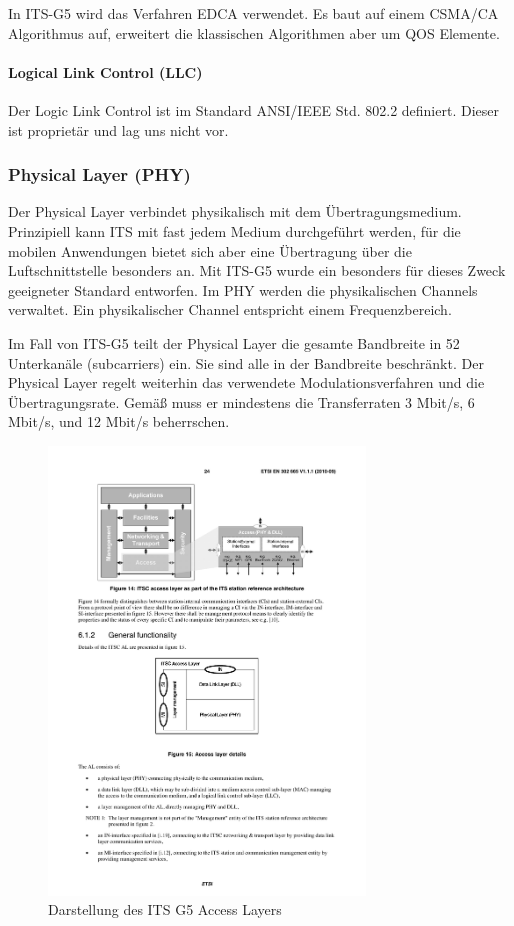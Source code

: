 In \ac{ITS-G5} wird das Verfahren \ac{EDCA} verwendet. Es baut auf einem CSMA/CA Algorithmus auf, erweitert die klassischen Algorithmen aber um \ac{QOS} Elemente. 

\paragraph{Logical Link Control (LLC)}
Der Logic Link Control ist im Standard ANSI/IEEE Std. 802.2 definiert. Dieser ist  proprietär und lag uns nicht vor.

\subsubsection{Physical Layer (PHY)}
Der Physical Layer verbindet physikalisch mit dem Übertragungsmedium. Prinzipiell kann \ac{ITS} mit fast jedem Medium durchgeführt werden, für die mobilen Anwendungen bietet sich aber eine Übertragung über die Luftschnittstelle besonders an. Mit  \ac{ITS-G5} wurde ein besonders für dieses Zweck geeigneter Standard entworfen. Im PHY werden die physikalischen Channels verwaltet. Ein physikalischer Channel entspricht einem Frequenzbereich. 

Im Fall von \ac{ITS-G5} teilt der Physical Layer die gesamte Bandbreite in 52 Unterkanäle (subcarriers) ein. Sie sind alle in der Bandbreite beschränkt. Der Physical Layer regelt weiterhin das verwendete Modulationsverfahren und die Übertragungsrate. Gemäß \cite{en302663} muss er mindestens die Transferraten 3 Mbit/s, 6 Mbit/s, und 12 Mbit/s beherrschen. 
 
\begin{figure}
	\includegraphics[width=0.75\textwidth]{content/images/02_architektur/accessLayer.pdf}
	\caption{Darstellung des ITS G5 Access Layers \cite{en302665}}
	\label{fig:architektur_accessLayer}
\end{figure}


